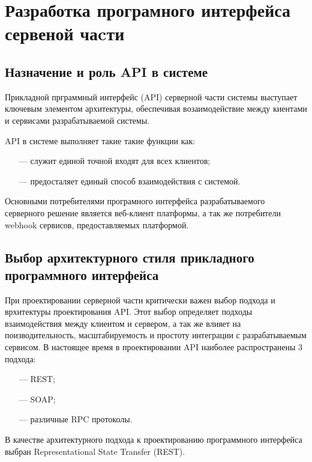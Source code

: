 \section{Разработка програмного интерфейса сервеной чаcти}

\subsection{Назначение и роль API в системе}

Прикладной прграммный интерфейс (API) \cite{ong2015materials} серверной части системы выступает ключевым элементом архитектуры, обеспечивая возаимодействие между киентами и сервисами разрабатываемой системы.

API в системе выполняет такие такие функции как:

\begin{itemize}
  \item[---]служит единой точной входят для всех клиентов;
  \item[---]предосталяет единый способ взаимодействия с системой.
\end{itemize}

Основными потребителями програмного интерфейса разрабатываемого серверного решение является веб-клиент платформы, а так же потребители webhook\cite{biehl2017webhooks} сервисов, предоставляемых платформой.

\subsection{Выбор архитектурного стиля прикладного программного интерфейса}

При проектировании серверной части критически важен выбор подхода и врхитектуры проектирования API.
Этот выбор определяет подходы взаимодействия между клиентом и сервером, а так же влияет на поизводительность, масштабируемость и простоту интеграции с разрабатываемым сервисом.
В настоящее время в проектировании API наиболее распространены 3 подхода: 

\begin{itemize}
  \item[---]REST\cite{wilde2011rest};
  \item[---]SOAP\cite{box2000simple};
  \item[---]различные RPC протоколы\cite{srinivasan1995rpc}. 
\end{itemize}

В качестве архитектурного подхода к проектированию программного интерфейса выбран Representational State Transfer (REST).

